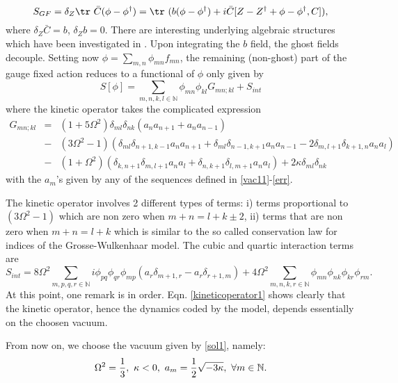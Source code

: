 \documentclass[a4paper]{jpconf}
\numberwithin{equation}{section}
\theoremstyle{nonumberplain}
\begin{document}
\begin{equation}
S_{GF}=\delta_Z\tr\ {\bar{C}}(\phi-\phi^\dag)=\tr\ ( b(\phi-\phi^\dag)+i{\bar{C}}[Z-Z^\dag+\phi-\phi^\dag,C])\label{gaugefixingphi},
\end{equation}
where $\delta_Z{\bar{C}}=b$, $\delta_Zb=0$. There are interesting underlying algebraic structures which have been investigated in \cite{rsw}. Upon integrating the $b$ field, the ghost fields decouple. Setting now $\phi=\sum_{m,n}\phi_{mn}f_{mn}$, the remaining (non-ghost) part of the gauge fixed action reduces to a functional of $\phi$ only given by
\begin{equation}
S[\phi]=\sum_{m,n,k,l\in\mathbb{N}} \phi_{mn}\phi_{kl}G_{mn;kl}+S_{int}\label{actmatrix}
\end{equation}
where the kinetic operator takes the complicated expression
\begin{eqnarray}
G_{mn;kl} &=&(1+5\Omega^2)\delta_{ml}\delta_{nk}(a_na_{n+1}+a_na_{n-1})\nonumber\\
&-&(3\Omega^2-1)(\delta_{ml}\delta_{n+1,k-1}a_na_{n+1}+\delta_{ml}\delta_{n-1,k+1}a_na_{n-1}
-2\delta_{m,l+1}\delta_{k+1,n}a_na_l)\nonumber \\
&-&(1+\Omega^2)(\delta_{k,n+1}\delta_{m,l+1}a_na_l+\delta_{n,k+1}\delta_{l,m+1}a_na_l)+2\kappa\delta_{ml}\delta_{nk}\label{kineticoperator1}
\end{eqnarray}
with the $a_m$'s given by any of the sequences defined in \eqref{vac11}-\eqref{err}. \par
The kinetic operator involves 2 different types of terms: i) terms proportional to $(3\Omega^2-1)$ which are non zero when $m+n=l+k\pm2$, ii) terms that are non zero when $m+n=l+k$ which is similar to the so called conservation law for indices of the Grosse-Wulkenhaar model. The cubic and quartic interaction terms are
\begin{equation}
S_{int}=8\Omega^2\sum_{m,p,q,r\in\mathbb{N}}i\phi_{pq}\phi_{qr}\phi_{mp}(a_r\delta_{m+1,r}-a_r\delta_{r+1,m})+
4\Omega^2\sum_{m,n,k,r\in\mathbb{N}}\phi_{mn}\phi_{nk}\phi_{kr}\phi_{rm}\label{interactmatrix}.
\end{equation}
At this point, one remark is in order. Eqn. \eqref{kineticoperator1} shows clearly that the kinetic operator, hence the dynamics coded by the model, depends essentially on the choosen vacuum.\par
From now on, we choose the vacuum given by \eqref{sol1}, namely: 
\begin{equation}
\Omega^2={{1}\over{3}},\ \kappa<0,\ a_m={{1}\over{2}}{\sqrt{ -3\kappa}},\ \forall m\in\mathbb{N}\nonumber.
\end{equation}
\end{document}

